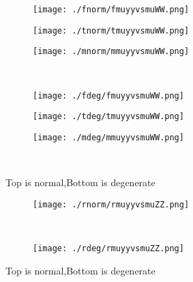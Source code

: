 \documentclass[aps,floats,floatfix,nofootinbib]{revtex4-1}
\begin{document}
\begin{center}
\begin{figure}
\begin{subfigure}{0.3\textwidth}
\texttt{[image: ./fnorm/fmuyyvsmuWW.png]}
\label{}
\end{subfigure}
\begin{subfigure}{0.3\textwidth}
\texttt{[image: ./tnorm/tmuyyvsmuWW.png]}
\label{}
\end{subfigure}
\begin{subfigure}{0.3\textwidth}
\texttt{[image: ./mnorm/mmuyyvsmuWW.png]}
\label{}
\end{subfigure}\\
\begin{subfigure}{0.3\textwidth}
\texttt{[image: ./fdeg/fmuyyvsmuWW.png]}
\label{}
\end{subfigure}
\begin{subfigure}{0.3\textwidth}
\texttt{[image: ./tdeg/tmuyyvsmuWW.png]}
\label{}
\end{subfigure}
\begin{subfigure}{0.3\textwidth}
\texttt{[image: ./mdeg/mmuyyvsmuWW.png]}
\label{}
\end{subfigure}\\
\caption{Top is normal,Bottom is degenerate}
\end{figure}
\end{center}

\begin{center}
\begin{figure}
\begin{subfigure}{0.95\textwidth}
\texttt{[image: ./rnorm/rmuyyvsmuZZ.png]}
\label{}
\end{subfigure}\\
\begin{subfigure}{0.95\textwidth}
\texttt{[image: ./rdeg/rmuyyvsmuZZ.png]}
\label{}
\end{subfigure}
\caption{Top is normal,Bottom is degenerate}
\end{figure}
\end{center}
\end{document}
